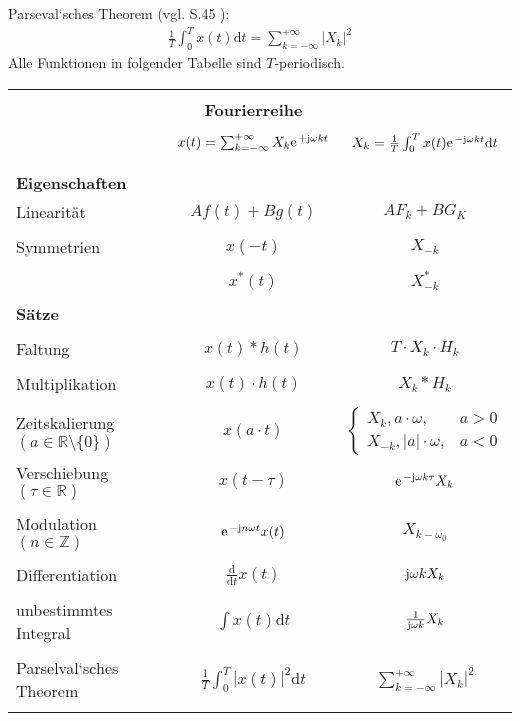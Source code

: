 \documentclass[11pt,a4paper,DIV=12]{scrartcl}
\begin{document}
Parseval`sches Theorem (vgl. \cite{KressKaufhold2010} S.45 ):
\begin{align}
	\frac{1}{T}\int_{0}^{T}x(t)\mathrm{d}t=\sum_{k=-\infty}^{+\infty}|X_k|^2
\end{align}
Alle Funktionen in folgender Tabelle sind $T$-periodisch.\\
\begin{tabular}{|lcc|}
	\hline
	&&\\
	&\textbf{Fourierreihe}& \\
	\hline
	&&\\
	& $x(t)=\sum_{k=-\infty}^{+\infty}X_k\e^{+\im\omega k t} $ & $X_k=\frac{1}{T}\int_0^Tx(t)\e^{-\im\omega k t}\mathrm{d}t $ \\&&\\
	\hline
	&&\\
	\textbf{Eigenschaften} & & \\
	Linearität & $Af(t)+Bg(t)$ & $AF_k+BG_K$\\&& \\
	Symmetrien & $x(-t)$ & $X_{-k}$ \\ &&\\
	& $x^*(t)$ & $X^*_{-k}$ \\ &&\\
	\hline
	\textbf{Sätze} & & \\&& \\
	Faltung & $x(t)\ast h(t)$ & $T\cdot X_k\cdot H_k$ \\&& \\
	Multiplikation & $x(t)\cdot h(t)$ & $X_k \ast H_k $ \\&& \\
	Zeitskalierung $(a\in\mathbb{R}\setminus\{0\})$& $x(a\cdot t)$ & $\begin{cases}
		X_k,a\cdot\omega, &a>0\\
		X_{-k},|a|\cdot\omega, &a<0
	\end{cases}$\\
	Verschiebung $(\tau \in \mathbb{R})$ & $x(t-\tau)$& $\e^{-\im\omega k \tau}X_k$\\&& \\
	Modulation $(n \in \mathbb{Z})$& $\e^{-\im n \omega t}x(t)$ & $X_{k-\omega_0}$ \\&& \\
	Differentiation & $\frac{\mathrm{d}}{\mathrm{d}t}x(t)$ & $\im\omega k X_k$\\&& \\
	unbestimmtes Integral &$\int x(t)\mathrm{d}t $ & $\frac{1}{\im\omega k}X_k$\\&& \\
	Parselval`sches Theorem & $\frac{1}{T}\int_0^T|x(t)|^2\mathrm{d}t$ & $\sum_{k=-\infty}^{+\infty}|X_k|^2$\\&& \\
	\hline
\end{tabular}







\renewcommand{\refname}{Buchzitate}
\clearpage

\end{document}
